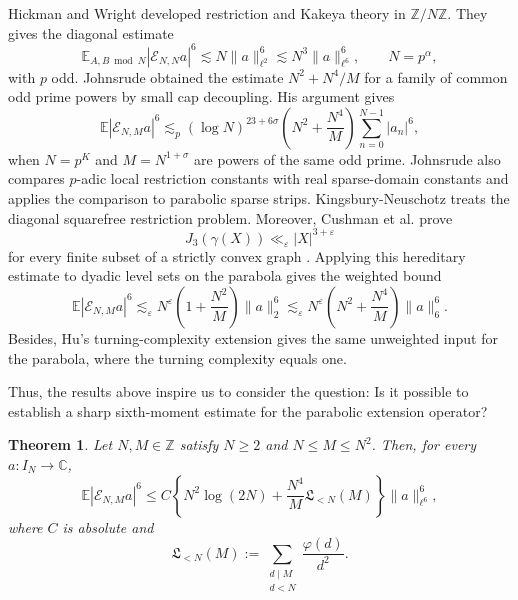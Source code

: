 \documentclass[11pt, twoside]{article}
\numberwithin{equation}{section}
\newtheorem{theorem}{Theorem}[section]
\theoremstyle{definition}
\newcommand{\Z}{\mathbb Z}
\newcommand{\C}{\mathbb C}
\newcommand{\E}{\mathbb E}
\newcommand{\cE}{\mathcal E}
\newcommand{\Lcal}{\mathfrak L}
\begin{document}
Hickman and Wright \cite{HickmanWright2018} developed restriction and Kakeya theory in $\Z/N\Z$.  They gives the diagonal estimate
$$
\E_{A,B\bmod N}|\cE_{N,N}a|^6
\lesssim N\|a\|_{\ell^2}^6
\lesssim N^3\|a\|_{\ell^6}^6,
\qquad N=p^\alpha,
$$
with $p$ odd. Johnsrude \cite{Johnsrude2024} obtained the estimate $N^2+N^4/M$ for a family
of common odd prime powers by small cap decoupling. His argument gives
$$
	\E
	\left|\cE_{N,M}a\right|^6
	\lesssim_p
	(\log N)^{23+6\sigma}
	\left(N^2+\frac{N^4}{M}\right)
	\sum_{n=0}^{N-1}|a_n|^6,
$$
when $N=p^K$ and $M=N^{1+\sigma}$ are powers of the same odd prime. Johnsrude \cite{Johnsrude2025Sparse} also compares
$p$-adic local restriction constants with real sparse-domain constants and applies the comparison
to parabolic sparse strips.
Kingsbury-Neuschotz \cite{KingsburyNeuschotz2025} treats the diagonal squarefree restriction problem. Moreover, Cushman et
al. \cite{CushmanDemeterWu2026} prove
$$
J_3(\gamma(X))\ll_\varepsilon |X|^{3+\varepsilon}
$$
for every finite subset of a strictly convex graph
.  Applying this hereditary
estimate to dyadic level sets on the parabola gives the weighted bound
$$
\E|\cE_{N,M}a|^6\lesssim_\varepsilon
N^\varepsilon\left(1+\frac{N^2}{M}\right)\|a\|_2^6
\lesssim_\varepsilon N^\varepsilon\left(N^2+\frac{N^4}{M}\right)\|a\|_6^6.
$$
Besides, Hu’s \cite{Hu2026} turning-complexity extension gives the same unweighted input for the parabola, where the
turning complexity equals one.

Thus, the results above inspire us to consider the question: Is it possible to establish a sharp sixth-moment estimate for the
parabolic extension operator?

\begin{theorem}\label{thm:main-q6}
Let $N,M\in\Z$ satisfy $N\ge 2$ and $N\leq M\leq N^2$. Then, for every $a:I_N\to\C$,
$$
\E|\cE_{N,M}a|^6
\leq
C\left\{
N^2\log(2N)+\frac{N^4}{M}\Lcal_{<N}(M)
\right\}\|a\|_{\ell^6}^6,
$$
where $C$ is absolute and
$$
\Lcal_{<N}(M)
:=
\sum_{\substack{d\mid M\\d<N}}\frac{\varphi(d)}{d^2}.
$$
\end{theorem}
\end{document}
